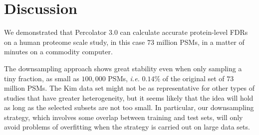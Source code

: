 \documentclass{article}
\begin{document}

\section*{Discussion}

We demonstrated that Percolator 3.0 can calculate accurate
protein-level FDRs on a human proteome scale study, in this case $73$
million PSMs, in a matter of minutes on a commodity computer.

The downsampling approach shows great stability even when only
sampling a tiny fraction, as small as $100,000$ PSMs, {\em i.e.}
$0.14\%$ of the original set of $73$ million PSMs.  The Kim data set
might not be as representative for other types of studies that have
greater heterogeneity, but it seems likely that the idea will hold as
long as the selected subsets are not too small.
In particular, our downsampling strategy, which involves some overlap
between training and test sets, will only avoid problems of
overfitting when the strategy is carried out on large data sets. 
\end{document}
